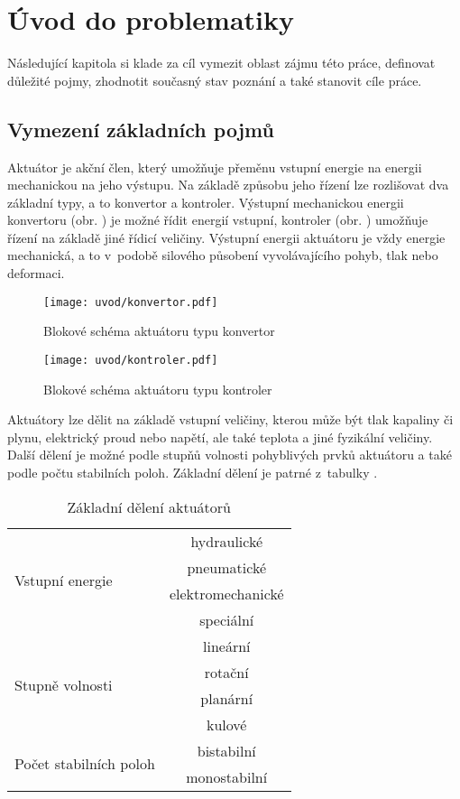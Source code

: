 \chapter{Úvod do problematiky}
Následující kapitola si klade za cíl vymezit oblast zájmu této práce, definovat důležité pojmy, zhodnotit současný stav poznání a také stanovit cíle práce.

\section{Vymezení základních pojmů}
Aktuátor je akční člen, který umožňuje přeměnu vstupní energie na energii mechanickou na jeho výstupu. Na základě způsobu jeho řízení lze rozlišovat dva základní typy, a to konvertor a kontroler. Výstupní mechanickou energii konvertoru (obr. ) je možné řídit energií vstupní, kontroler (obr. ) umožňuje řízení na základě jiné řídicí veličiny. Výstupní energii aktuátoru je vždy energie mechanická, a to v~podobě silového působení vyvolávajícího pohyb, tlak nebo deformaci. \cite{janocha2010actuators} \cite{ulrych2009aktuatory} \cite{mach2010aktuatory}

\begin{figure}[h!]
  \centering
  \texttt{[image: uvod/konvertor.pdf]}
  \caption{Blokové schéma aktuátoru typu konvertor}
  \label{obr:konvertor}
\end{figure}

\begin{figure}[h!]
  \centering
  \texttt{[image: uvod/kontroler.pdf]}
  \caption{Blokové schéma aktuátoru typu kontroler}
  \label{obr:kontroler}
\end{figure}

Aktuátory lze dělit na základě vstupní veličiny, kterou může být tlak kapaliny či plynu, elektrický proud nebo napětí, ale také teplota a jiné fyzikální veličiny. Další dělení je možné podle stupňů volnosti pohyblivých prvků aktuátoru a také podle počtu stabilních poloh. Základní dělení je patrné z~tabulky . \cite{brauer2006magnetic}

\begin{table}[h!]
\caption{Základní dělení aktuátorů}
\begin{center}
\begin{tabular}{|l|c|}
  \hline
  \multirow{4}{*}{Vstupní energie} & hydraulické \\
  & pneumatické \\
  & elektromechanické \\
  & speciální \\
  \hline
  \multirow{4}{*}{Stupně volnosti} & lineární \\
  & rotační \\
  & planární \\
  & kulové \\
  \hline
  \multirow{2}{*}{Počet stabilních poloh} & bistabilní \\
  & monostabilní \\
  \hline
\end{tabular}
\end{center}
\label{tab:deleni_aktuatoru}
\end{table}

